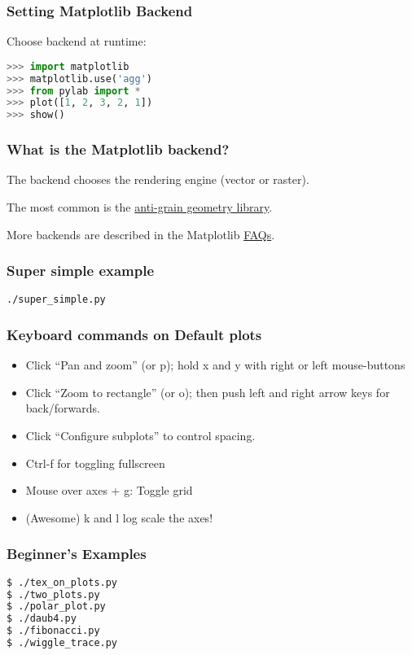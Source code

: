 \documentclass{beamer}
\begin{document}
\begin{frame}[fragile]
\frametitle{Setting Matplotlib Backend}
Choose backend at runtime:
\begin{lstlisting}[language=Python]
>>> import matplotlib
>>> matplotlib.use('agg')
>>> from pylab import *
>>> plot([1, 2, 3, 2, 1])
>>> show()
\end{lstlisting}
\end{frame}

\begin{frame}
\frametitle{What is the Matplotlib backend?}
The backend chooses the rendering engine (vector or raster).

The most common is the \href{http://agg.sourceforge.net/antigrain.com/index.html}{anti-grain geometry library}.

More backends are described in the Matplotlib \href{http://matplotlib.org/faq/usage_faq.html}{FAQs}.

\end{frame}

\begin{frame}
\frametitle{Super simple example}

\texttt{./super\_simple.py}

\end{frame}

\begin{frame}
\frametitle{Keyboard commands on Default plots}

\begin{itemize}

\item Click ``Pan and zoom'' (or p); hold x and y with right or left mouse-buttons
\item Click ``Zoom to rectangle'' (or o); then push left and right arrow keys for back/forwards.
\item Click ``Configure subplots'' to control spacing.
\item Ctrl-f for toggling fullscreen
\item Mouse over axes + g: Toggle grid
\item (Awesome) k and l log scale the axes!
\end{itemize}

\end{frame}


\begin{frame}[fragile]
\frametitle{Beginner's Examples}
\begin{lstlisting}[language=bash]
$ ./tex_on_plots.py
$ ./two_plots.py
$ ./polar_plot.py
$ ./daub4.py
$ ./fibonacci.py
$ ./wiggle_trace.py
\end{lstlisting}

\end{frame}
\end{document}
